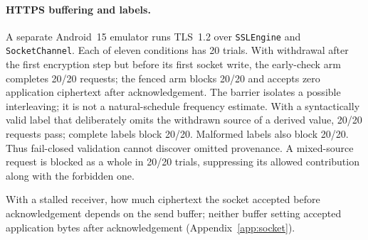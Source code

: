 \paragraph{HTTPS buffering and labels.} A separate Android~15 emulator runs TLS~1.2 over \texttt{SSLEngine} and \texttt{SocketChannel}. Each of eleven conditions has 20 trials. With withdrawal after the first encryption step but before its first socket write, the early-check arm completes 20/20 requests; the fenced arm blocks 20/20 and accepts zero application ciphertext after acknowledgement. The barrier isolates a possible interleaving; it is not a natural-schedule frequency estimate. With a syntactically valid label that deliberately omits the withdrawn source of a derived value, 20/20 requests pass; complete labels block 20/20. Malformed labels also block 20/20. Thus fail-closed validation cannot discover omitted provenance. A mixed-source request is blocked as a whole in 20/20 trials, suppressing its allowed contribution along with the forbidden one.

With a stalled receiver, how much ciphertext the socket accepted before acknowledgement depends on the send buffer; neither buffer setting accepted application bytes after acknowledgement (Appendix~\ref{app:socket}).
